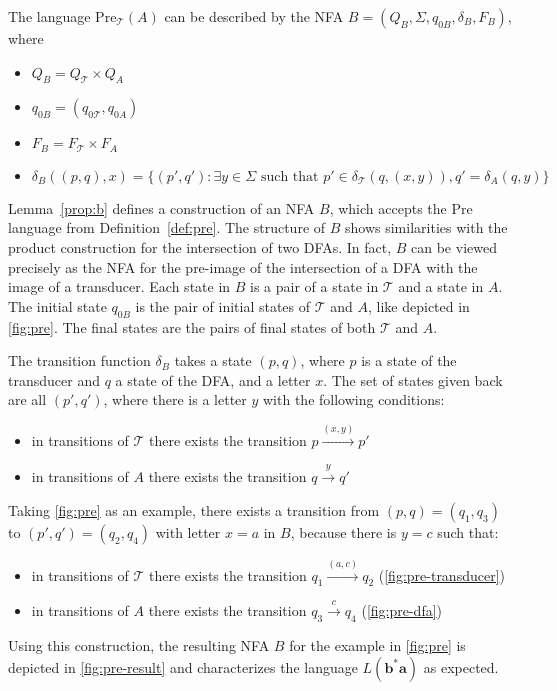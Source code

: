 \begin{lemma}\label{prop:b}
The language $\text{Pre}_{\mathcal{T}}(A)$ can be described by the NFA $B = (Q_{B},\Sigma,q_{0B},\delta_{B},F_{B})$, where 
\begin{itemize}[--,noitemsep]
\item $Q_{B} = Q_{\mathcal{T}} \times Q_{A}$
\item $q_{0B} = (q_{0\mathcal{T}},q_{0A})$
\item $F_{B} = F_{\mathcal{T}} \times F_{A}$
\item $\delta_{B}((p,q),x) = \{(p',q'): \exists y \in \Sigma \text{ such that } p' \in \delta_{\mathcal{T}}(q,(x,y)), q' = \delta_{A}(q,y)\}$
\end{itemize}
\end{lemma}

Lemma~\autoref{prop:b} defines a construction of an NFA $B$, which accepts the Pre language from Definition~\autoref{def:pre}. 
The structure of $B$ shows similarities with the product construction for the intersection of two DFAs. In fact, $B$ can be viewed precisely as the NFA for the pre-image of the intersection of a DFA with the image of a transducer. Each state in $B$ is a pair of a state in $\mathcal{T}$ and a state in $A$. The initial state $q_{0B}$ is the pair of initial states of $\mathcal{T}$ and $A$, like depicted in \autoref{fig:pre}. The final states are the pairs of final states of both $\mathcal{T}$ and $A$.
 
\par

The transition function $\delta_{B}$ takes a state $(p,q)$, where $p$ is a state of the transducer and $q$ a state of the DFA, and a letter $x$. The set of states given back are all $(p',q')$, where there is a letter $y$ with the following conditions:

\begin{itemize}[--,noitemsep]
\item in transitions of $\mathcal{T}$ there exists the transition $p \xrightarrow{(x,y)} p'$
\item in transitions of $A$ there exists the transition $q \xrightarrow{y} q'$
\end{itemize}

Taking \autoref{fig:pre} as an example, there exists a transition from $(p,q)=(q_{1},q_{3})$ to $(p',q')=(q_{2},q_{4})$ with letter $x=a$ in $B$, because there is $y=c$ such that:

\begin{itemize}[--,noitemsep]
\item in transitions of $\mathcal{T}$ there exists the transition $q_{1} \xrightarrow{(a,c)} q_{2}$ (\autoref{fig:pre-transducer})
\item in transitions of $A$ there exists the transition $q_{3} \xrightarrow{c} q_{4}$ (\autoref{fig:pre-dfa})
\end{itemize}
Using this construction, the resulting NFA $B$ for the example in \autoref{fig:pre} is depicted in \autoref{fig:pre-result} and characterizes the language $L(\bm{b^{*}a})$ as expected.

